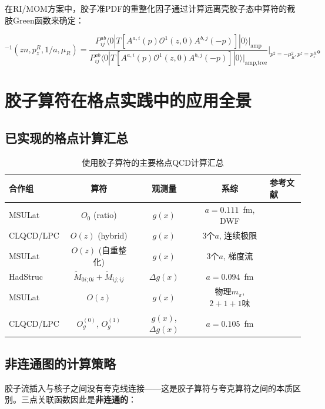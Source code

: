 \documentclass[12pt,a4paper]{ctexart}
\theoremstyle{definition}
\begin{document}
在RI/MOM方案中\cite{Zhang2019}，胶子准PDF的重整化因子通过计算远离壳胶子态中算符的截肢Green函数来确定：

\begin{equation}
[e^{\delta m|z|}Z^2_{11}Z_3]^{-1}(zn, p^R_z, 1/a, \mu_R) = \frac{P^{ab}_{ij} \langle 0| T[A^{a,i}(p) \mathcal{O}^1(z,0) A^{b,j}(-p)] |0\rangle |_{\text{amp}}}{P^{ab}_{ij} \langle 0| T[A^{a,i}(p) \mathcal{O}^1(z,0) A^{b,j}(-p)] |0\rangle |_{\text{amp,tree}}} \Bigg|_{p^2=-\mu^2_R, p^z=p^R_z}。
\label{eq:RI_MOM}
\end{equation}

\section{胶子算符在格点实践中的应用全景}

\subsection{已实现的格点计算汇总}

\begin{table}[H]
\centering
\caption{使用胶子算符的主要格点QCD计算汇总}
\label{tab:gluon_op_applications}
\begin{tabular}{lcccl}
\toprule
合作组 & 算符 & 观测量 & 系综 & 参考文献 \\
\midrule
MSULat & $O_0$ (ratio) & $g(x)$ & $a=0.111$~fm, DWF & \cite{Fan2018gluon} \\
CLQCD/LPC & $O(z)$ (hybrid) & $g(x)$ & 3个$a$, 连续极限 & \cite{Chen2025gluon} \\
MSULat & $O(z)$ (自重整化) & $g(x)$ & 3个$a$, 梯度流 & \cite{NieMiera2025} \\
HadStruc & $\tilde{M}_{0i;0i}+\tilde{M}_{ij;ij}$ & $\Delta g(x)$ & $a=0.094$~fm & \cite{Egerer2022} \\
MSULat & $O(z)$ & $g(x)$ & 物理$m_\pi$, $2+1+1$味 & \cite{Lin2025gluon} \\
CLQCD/LPC & $O^{(0)}_g$, $O^{(1)}_g$ & $g(x)$, $\Delta g(x)$ & $a=0.105$~fm & \cite{NoteGluonPDFs} \\
\bottomrule
\end{tabular}
\end{table}

\subsection{非连通图的计算策略}

胶子流插入与核子之间没有夸克线连接——这是胶子算符与夸克算符之间的本质区别。三点关联函数因此是\textbf{非连通的}\cite{NoteGluonPDFs,Chen2025gluon}：
\end{document}
